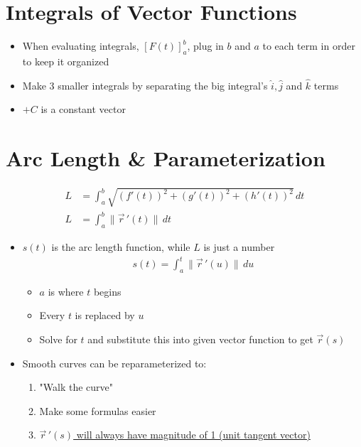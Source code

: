 \documentclass{article}
\begin{document}
\section{Integrals of Vector Functions}
\begin{itemize}
  \item When evaluating integrals, $[F(t)]^b_a$, plug in $b$ and $a$ to each term in order to keep it organized
  \item Make 3 smaller integrals by separating the big integral's $\hat{i}, \hat{j}$ and $\hat{k}$ terms
  \item $+C$ is a constant vector
\end{itemize}


\section{Arc Length \& Parameterization}
\begin{align}
  L &= \int_{a}^{b} \sqrt{(f'(t))^2 + (g'(t))^2 + (h'(t))^2} \, dt \\
  L &= \int_{a}^{b} \|\vec{r}\,'(t)\| \, dt
\end{align}
\begin{itemize}
  \item $s(t)$ is the arc length function, while $L$ is just a number
  \begin{align}
    s(t) = \int_{a}^{t} \|\vec{r}\,'(u)\| \, du
  \end{align}
  \begin{itemize}
    \item $a$ is where $t$ begins
    \item Every $t$ is replaced by $u$
    \item Solve for $t$ and substitute this into given vector function to get $\vec{r}(s)$
  \end{itemize}
  \item Smooth curves can be reparameterized to:
  \begin{enumerate}
    \item "Walk the curve"
    \item Make some formulas easier
    \item \underline{$\vec{r}\,'(s)$ will always have magnitude of 1 (unit tangent vector)}
  \end{enumerate}
\end{itemize}
\end{document}
